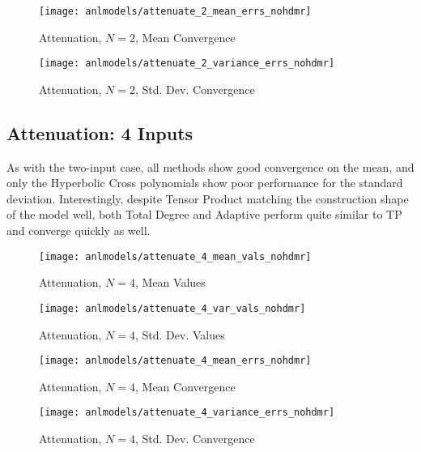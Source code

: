 \begin{figure}[H]
  \centering
  \texttt{[image: anlmodels/attenuate\_2\_mean\_errs\_nohdmr]}
  \caption{Attenuation, $N=2$, Mean Convergence}
  \label{fig:attenuate mean errors 2}
\end{figure}
\begin{figure}[H]
  \centering
  \texttt{[image: anlmodels/attenuate\_2\_variance\_errs\_nohdmr]}
  \caption{Attenuation, $N=2$, Std. Dev. Convergence}
  \label{fig:attenuate var errors 2}
\end{figure}


\subsection{Attenuation: 4 Inputs}
As with the two-input case, all methods show good convergence on the mean, and only the Hyperbolic Cross
polynomials show poor performance for the standard deviation.  Interestingly, despite Tensor Product matching
the construction shape of the model well, both Total Degree and Adaptive perform quite similar to TP and converge
quickly as well.
\begin{figure}[H]
  \centering
  \texttt{[image: anlmodels/attenuate\_4\_mean\_vals\_nohdmr]}
  \caption{Attenuation, $N=4$, Mean Values}
  \label{fig:attenuate mean values 4}
\end{figure}
\begin{figure}[H]
  \centering
  \texttt{[image: anlmodels/attenuate\_4\_var\_vals\_nohdmr]}
  \caption{Attenuation, $N=4$, Std. Dev. Values}
  \label{fig:attenuate var values 4}
\end{figure}

\begin{figure}[H]
  \centering
  \texttt{[image: anlmodels/attenuate\_4\_mean\_errs\_nohdmr]}
  \caption{Attenuation, $N=4$, Mean Convergence}
  \label{fig:attenuate mean errors 4}
\end{figure}
\begin{figure}[H]
  \centering
  \texttt{[image: anlmodels/attenuate\_4\_variance\_errs\_nohdmr]}
  \caption{Attenuation, $N=4$, Std. Dev. Convergence}
  \label{fig:attenuate var errors 4}
\end{figure}

